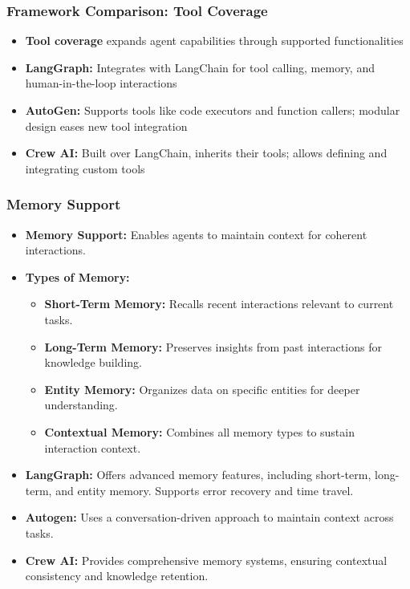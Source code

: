 \begin{frame}[fragile]\frametitle{Framework Comparison: Tool Coverage}
\begin{itemize}
    \item \textbf{Tool coverage} expands agent capabilities through supported functionalities
    \item \textbf{LangGraph:} Integrates with LangChain for tool calling, memory, and human-in-the-loop interactions
    \item \textbf{AutoGen:} Supports tools like code executors and function callers; modular design eases new tool integration
    \item \textbf{Crew AI:} Built over LangChain, inherits their tools; allows defining and integrating custom tools
\end{itemize}
\end{frame}

\begin{frame}[fragile]\frametitle{Memory Support}
\begin{itemize}
    \item \textbf{Memory Support:} Enables agents to maintain context for coherent interactions.
    \item \textbf{Types of Memory:}
    \begin{itemize}
        \item \textbf{Short-Term Memory:} Recalls recent interactions relevant to current tasks.
        \item \textbf{Long-Term Memory:} Preserves insights from past interactions for knowledge building.
        \item \textbf{Entity Memory:} Organizes data on specific entities for deeper understanding.
        \item \textbf{Contextual Memory:} Combines all memory types to sustain interaction context.
    \end{itemize}
    \item \textbf{LangGraph:} Offers advanced memory features, including short-term, long-term, and entity memory. Supports error recovery and time travel.
    \item \textbf{Autogen:} Uses a conversation-driven approach to maintain context across tasks.
    \item \textbf{Crew AI:} Provides comprehensive memory systems, ensuring contextual consistency and knowledge retention.
\end{itemize}
\end{frame}

